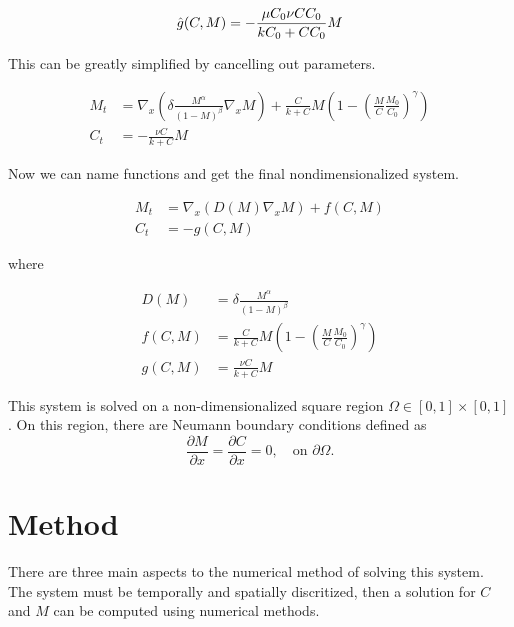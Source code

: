 \documentclass{article}
\theoremstyle{plain}
\begin{document}
  \begin{equation}
    \hat{g}({C},M) = -\frac{{\mu C_0 \nu} {C C_0}}{{k C_0} + {C C_0}} M \\
  \end{equation}
  
  This can be greatly simplified by cancelling out parameters.
  
  \begin{align}
    M_t &= \nabla_x \left( {\delta} \frac{M^\alpha}{(1-M)^\beta} \nabla_x M\right) + \frac{ C }{{k } + {C}} M \left(1 - \left( \frac{M}{{C}} \frac{M_0}{C_0} \right)^\gamma \right) \\
    C_t &= - \frac{\nu C}{k + C} M
  \end{align}
  
  Now we can name functions and get the final nondimensionalized system.
  
  \begin{align} \label{equ:model_system}
    M_t &= \nabla_x \left( D(M) \nabla_x M \right) + f(C,M) \\
    C_t &= - g(C,M) 
  \end{align}
  
  where
  
  \begin{equation}
  \begin{aligned} \label{equ:model_functions}
    D(M) &= \delta \frac{M^\alpha}{(1 - M)^\beta} \\
    f(C,M) &= \frac{ C }{{k } + {C}} M \left(1 - \left( \frac{M}{{C}} \frac{M_0}{C_0} \right)^\gamma \right) \\
    g(C,M) &= \frac{\nu C}{k +C} M
  \end{aligned}
  \end{equation}
  

  This system is solved on a non-dimensionalized square region $\Omega \in \left[0,1 \right] \times \left[0,1 \right]$.
  On this region, there are Neumann boundary conditions defined as
  \begin{equation}
    \frac{\partial M}{\partial x} = \frac{\partial C}{\partial x} = 0, \quad \text{on } \partial\Omega. 
  \end{equation}

\section{Method}
  There are three main aspects to the numerical method of solving this system.
  The system must be temporally and spatially discritized, then a solution for $C$ and $M$ can be computed using numerical methods.
 
\end{document}
